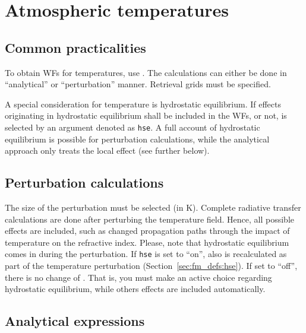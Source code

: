 \section{Atmospheric temperatures}
\label{sec:wfuns:atmtemp}

\subsection{Common practicalities}
%
To obtain WFs for temperatures, use .
The calculations can either be done in ``analytical'' or ``perturbation''
manner. Retrieval grids must be specified.

A special consideration for temperature is hydrostatic equilibrium. If effects
originating in hydrostatic equilibrium shall be included in the WFs, or
not, is selected by an argument denoted as \verb|hse|. A full account of
hydrostatic equilibrium is possible for perturbation calculations, while the
analytical approach only treats the local effect (see further below).


\subsection{Perturbation calculations}
%
The size of the perturbation must be selected (in K).
Complete radiative transfer calculations are done after perturbing the
temperature field. Hence, all possible effects are included, such as changed
propagation paths through the impact of temperature on the refractive index.
Please, note that hydrostatic equilibrium comes in during the perturbation. If
\verb|hse| is set to ``on'', also  is recalculated as part
of the temperature perturbation (Section~\ref{sec:fm_defs:hse}). If set to
``off'', there is no change of . That is, you must make an
active choice regarding hydrostatic equilibrium, while others effects are
included automatically.


\subsection{Analytical expressions}
%
